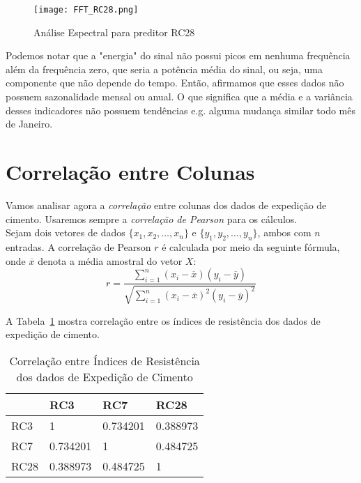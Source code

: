\begin{figure}[H]
\centering
\texttt{[image: FFT\_RC28.png]}
\caption{Análise Espectral para preditor RC28}
\end{figure}


Podemos notar que a "energia" do sinal não possui picos em nenhuma frequência além da frequência zero, que seria a potência média do sinal, ou seja, uma componente que não depende do tempo. Então, afirmamos que esses dados não possuem sazonalidade mensal ou anual. O que significa que a média e a variância desses indicadores não possuem tendências e.g. alguma mudança similar todo mês de Janeiro.


\section{Correlação entre Colunas}

Vamos analisar agora a \textit{correlação} entre colunas dos dados de expedição
de cimento. Usaremos sempre a \textit{correlação de Pearson} para os cálculos.
\\
Sejam dois vetores de
dados $\{x_1,x_2, \dots , x_n\}$ e $\{y_1,y_2, \dots , y_n\}$, ambos com $n$ entradas. A correlação de Pearson $r$ é calculada
por meio da seguinte fórmula, onde $\overline{x}$ denota a média amostral do
vetor $X$: \\



\[ r = \frac{{}\sum_{i=1}^{n} (x_i - \overline{x})(y_i - \overline{y})}
{\sqrt{\sum_{i=1}^{n} (x_i - \overline{x})^2(y_i - \overline{y})^2}} \] 


\bigskip


A Tabela~\ref{corr3728} mostra correlação entre os índices de resistência dos dados de
expedição de cimento. \\

\begin{table}[H]
\centering
\begin{tabular}{l|lll}
\cline{2-4}
\textbf{}                  & \multicolumn{1}{l|}{RC3} & \multicolumn{1}{l|}{RC7} & \multicolumn{1}{l|}{RC28} \\ \hline
\multicolumn{1}{|l|}{RC3}  & 1                        & 0.734201                 & 0.388973                  \\ \cline{1-1}
\multicolumn{1}{|l|}{RC7}  & 0.734201                 & 1                        & 0.484725                  \\ \cline{1-1}
\multicolumn{1}{|l|}{RC28} & 0.388973                 & 0.484725                 & 1                         \\ \cline{1-1}
\end{tabular}
\caption{Correlação entre Índices de Resistência dos dados de
  Expedição de Cimento}
\label{corr3728}
\end{table}






